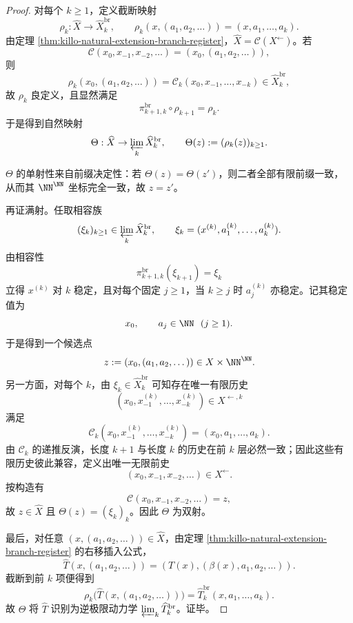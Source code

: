\begin{proof}
对每个 \(k\ge 1\)，定义截断映射
\[
\rho_k:\widehat X\to \widehat X_k^{\mathrm{br}},
\qquad
\rho_k(x,(a_1,a_2,\dots))=(x,a_1,\dots,a_k).
\]
由定理 \ref{thm:killo-natural-extension-branch-register}，\(\widehat X=\mathcal C(X^{\leftarrow})\)。若
\[
\mathcal C(x_0,x_{-1},x_{-2},\dots)=(x_0,(a_1,a_2,\dots)),
\]
则
\[
\rho_k(x_0,(a_1,a_2,\dots))
=
\mathcal C_k(x_0,x_{-1},\dots,x_{-k})\in \widehat X_k^{\mathrm{br}},
\]
故 \(\rho_k\) 良定义，且显然满足
\[
\pi_{k+1,k}^{\mathrm{br}}\circ \rho_{k+1}=\rho_k.
\]
于是得到自然映射
\[
\Theta:\widehat X\to \varprojlim_k \widehat X_k^{\mathrm{br}},
\qquad
\Theta(z):=(\rho_k(z))_{k\ge 1}.
\]

\(\Theta\) 的单射性来自前缀决定性：若 \(\Theta(z)=\Theta(z')\)，则二者全部有限前缀一致，从而其 \(\NN^\NN\) 坐标完全一致，故 \(z=z'\)。

再证满射。任取相容族
\[
(\xi_k)_{k\ge 1}\in \varprojlim_k \widehat X_k^{\mathrm{br}},
\qquad
\xi_k=(x^{(k)},a_1^{(k)},\dots,a_k^{(k)}).
\]
由相容性
\[
\pi_{k+1,k}^{\mathrm{br}}(\xi_{k+1})=\xi_k
\]
立得 \(x^{(k)}\) 对 \(k\) 稳定，且对每个固定 \(j\ge 1\)，当 \(k\ge j\) 时 \(a_j^{(k)}\) 亦稳定。记其稳定值为
\[
x_0,\qquad a_j\in \NN\ \ (j\ge 1).
\]
于是得到一个候选点
\[
z:=(x_0,(a_1,a_2,\dots))\in X\times \NN^\NN.
\]
另一方面，对每个 \(k\)，由 \(\xi_k\in \widehat X_k^{\mathrm{br}}\) 可知存在唯一有限历史
\[
(x_0,x_{-1}^{(k)},\dots,x_{-k}^{(k)})\in X^{\leftarrow,k}
\]
满足
\[
\mathcal C_k(x_0,x_{-1}^{(k)},\dots,x_{-k}^{(k)})
=
(x_0,a_1,\dots,a_k).
\]
由 \(\mathcal C_k\) 的递推反演，长度 \(k+1\) 与长度 \(k\) 的历史在前 \(k\) 层必然一致；因此这些有限历史彼此兼容，定义出唯一无限前史
\[
(x_0,x_{-1},x_{-2},\dots)\in X^{\leftarrow}.
\]
按构造有
\[
\mathcal C(x_0,x_{-1},x_{-2},\dots)=z,
\]
故 \(z\in \widehat X\) 且 \(\Theta(z)=(\xi_k)_k\)。因此 \(\Theta\) 为双射。

最后，对任意 \((x,(a_1,a_2,\dots))\in \widehat X\)，由定理 \ref{thm:killo-natural-extension-branch-register} 的右移插入公式，
\[
\widehat T(x,(a_1,a_2,\dots))=(T(x),(\beta(x),a_1,a_2,\dots)).
\]
截断到前 \(k\) 项便得到
\[
\rho_k\bigl(\widehat T(x,(a_1,a_2,\dots))\bigr)
=
\widehat T_k^{\mathrm{br}}(x,a_1,\dots,a_k).
\]
故 \(\Theta\) 将 \(\widehat T\) 识别为逆极限动力学 \(\varprojlim_k \widehat T_k^{\mathrm{br}}\)。证毕。
\end{proof}

